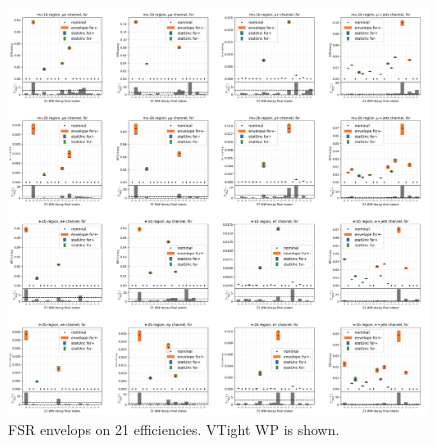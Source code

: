 \begin{figure}
    \centering
    \includegraphics[width=0.99\textwidth]{chapters/Appendix/sectionTTSyst/figures/fsr.png}

    

    
    \caption{FSR envelops on 21 efficiencies. VTight WP is shown.}
    \label{fig:appendix:reweighttt:effAfterCorrFSR}
\end{figure}



